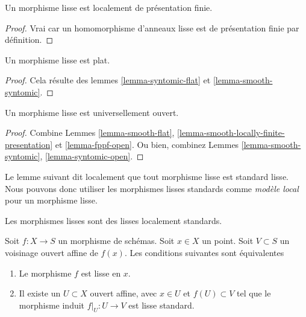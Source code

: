 \begin{lemma}
\label{lemma-smooth-locally-finite-presentation}
Un morphisme lisse est localement de présentation finie.
\end{lemma}

\begin{proof}
Vrai car un homomorphisme d'anneaux lisse est de présentation finie par
définition.
\end{proof}

\begin{lemma}
\label{lemma-smooth-flat}
Un morphisme lisse est plat.
\end{lemma}

\begin{proof}
Cela résulte des lemmes \ref{lemma-syntomic-flat} et \ref{lemma-smooth-syntomic}.
\end{proof}

\begin{lemma}
\label{lemma-smooth-open}
Un morphisme lisse est universellement ouvert.
\end{lemma}

\begin{proof}
Combine
Lemmes \ref{lemma-smooth-flat},
\ref{lemma-smooth-locally-finite-presentation} et
\ref{lemma-fppf-open}.
Ou bien, combinez
Lemmes \ref{lemma-smooth-syntomic},
\ref{lemma-syntomic-open}.
\end{proof}

\noindent
Le lemme suivant dit localement que tout morphisme lisse est standard lisse. Nous pouvons donc utiliser
les morphismes lisses standards comme {\it modèle local}
pour un morphisme lisse.

\begin{lemma}
\label{lemma-smooth-locally-standard-smooth}
\begin{slogan}
Les morphismes lisses sont des lisses localement standards.
\end{slogan}
Soit $f : X  \to S$ un morphisme de schémas. Soit $x \in X$
un point. Soit $V \subset S$
un voisinage ouvert affine de $f(x)$. Les conditions
suivantes sont équivalentes
\begin{enumerate}
\item Le morphisme $f$ est lisse en $x$.
\item Il existe un $U \subset X$ ouvert affine,
avec $x \in U$ et $f(U) \subset V$ tel que le morphisme
induit $f|_U : U \to V$ est lisse standard.
\end{enumerate}
\end{lemma}


